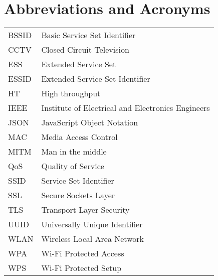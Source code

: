 \chapter*{Abbreviations and Acronyms}


\noindent
\begin{longtable}{@{}p{}p{}@{}}
BSSID & Basic Service Set Identifier \\
CCTV & Closed Circuit Television \\
ESS & Extended Service Set \\
ESSID & Extended Service Set Identifier \\
HT & High throughput \\
IEEE & Institute of Electrical and Electronics Engineers \\
JSON & JavaScript Object Notation \\
MAC & Media Access Control \\
MITM & Man in the middle \\
QoS & Quality of Service \\
SSID & Service Set Identifier \\
SSL & Secure Sockets Layer \\
TLS & Transport Layer Security \\
UUID & Universally Unique Identifier \\
WLAN & Wireless Local Area Network \\
WPA & Wi-Fi Protected Access \\
WPS & Wi-Fi Protected Setup \\
\end{longtable}

